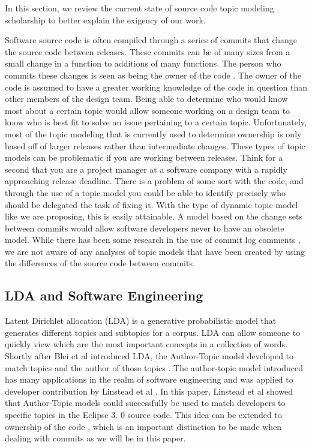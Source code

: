 In this section, we review the current state of source code topic modeling scholarship to better explain the exigency of our work.

Software source code is often compiled through a series of commits that change the source code between releases.
These commits can be of many sizes from a small change in a function to additions of many functions.
The person who commits these changes is seen as being the owner of the code \cite{Corley2012}.
The owner of the code is assumed to have a greater working knowledge of the code in question than other members of the design team.
Being able to determine who would know most about a certain topic would allow someone working on a design team to know who is best fit to solve an issue pertaining to a certain topic.
Unfortunately, most of the topic modeling that is currently used to determine ownership is only based off of larger releases rather than intermediate changes.
These types of topic models can be problematic if you are working between releases.
Think for a second that you are a project manager at a software company with a rapidly approaching release deadline.
There is a problem of some sort with the code, and through the use of a topic model you could be able to identify precisely who should be delegated the task of fixing it.
With the type of dynamic topic model like we are proposing, this is easily attainable.
A model based on the change sets between commits would allow software developers never to have an obsolete model.
While there has been some research in the use of commit log comments \cite{Hindle2009}, we are not aware of any analyses of topic models that have been created by using the differences of the source code between commits.


\subsection{ LDA and Software Engineering }

Latent Dirichlet allocation (LDA) \cite{Blei2003} is a generative probabilistic model that generates different topics and subtopics for a corpus.
LDA can allow someone to quickly view which are the most important concepts in a collection of words.
Shortly after Blei et al introduced LDA, the Author-Topic model developed to match topics and the author of those topics \cite{Rosen-Zvi2004} \cite{Steyvers2004}.
The author-topic model introduced has many applications in the realm of software engineering and was applied to developer contribution by Linstead et al
\cite{Linstead2007}.
In this paper, Linstead et al showed that Author-Topic models could successfully be used to match developers to specific topics in the Eclipse 3.
0 source code.
This idea can be extended to ownership of the code \cite{Corley2012}, which is an important distinction to be made when dealing with commits as we will be in this paper.


